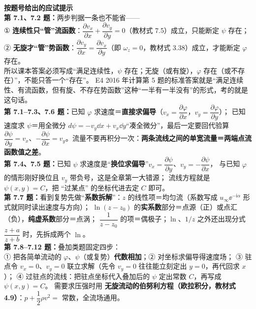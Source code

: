 \begin{banfa}
\textbf{按题号给出的应试提示}\\
\textbf{第 7.1、7.2 题：}两步判据一条也不能省——\\
① \textbf{连续性只“管”流函数}：$\dfrac{\partial v_x}{\partial x}+\dfrac{\partial v_y}{\partial y}=0$（教材式 7.5）成立，只能断定 $\psi$ 存在；
② \textbf{无旋才“管”势函数}：$\dfrac{\partial v_y}{\partial x}=\dfrac{\partial v_x}{\partial y}$（即 $\omega_z=0$，教材式 3.38）成立，才能断定 $\varphi$ 存在。\\
所以课本答案必须写成“满足连续性，$\psi$ 存在；无旋（或有旋），$\varphi$ 存在（或不存在）”，不能只答一个“存在”。
E4 2016 年计算第 5 题的标准答案就是“满足连续性、有流函数，但有旋、不存在势函数”这种“一半有一半没有”的形式，考的就是这句话。\\
\textbf{第 7.1--7.3、7.6 题：}已知 $\varphi$ 求速度＝\textbf{直接求偏导}（$v_x=\dfrac{\partial\varphi}{\partial x}$，$v_y=\dfrac{\partial\varphi}{\partial y}$）；
已知速度求 $\psi$＝用全微分 $d\psi=-v_y\dd x+v_x\dd y$“凑全微分”，最后一定要回代验算
$\dfrac{\partial\psi}{\partial y}=v_x$、$-\dfrac{\partial\psi}{\partial x}=v_y$。流量不要再积分一次：\textbf{两条流线之间的单宽流量＝两端点流函数值之差}。\\
\textbf{第 7.4、7.5 题：}已知 $\psi$ 求速度是“\textbf{换位求偏导}”$v_x=\dfrac{\partial\psi}{\partial y}$、$v_y=-\dfrac{\partial\psi}{\partial x}$，
与已知 $\varphi$ 的情形刚好换位且 $v_y$ 带负号，这是全章第一大错源；
流线方程就是 $\psi(x,y)=C$，把 ``过某点'' 的坐标代进去定 $C$ 即可。\\
\textbf{第 7.7 题：}看到复势先做“\textbf{系数拆解}”：$z$ 的线性项＝均匀流（系数写成 $u_\infty\ee^{-\mathrm{i}\alpha}$ 形式就同时读出速度与方向）；
$\ln(z-z_0)$ 的\textbf{实系数}部分＝点源（正）或点汇（负），\textbf{纯虚系数}部分＝点涡；
$\dfrac{1}{z-z_0}$ 的项＝偶极子；$\ln$、$1/z$ 之外还出现分式 $\dfrac{z+a}{z+b}$ 时，先拆成两个 $\ln$。\\
\textbf{第 7.8--7.12 题：}叠加类题固定四步：\\
① 把各简单流动的 $\varphi$、$\psi$（或复势）\textbf{代数相加}；② 对坐标求偏导得速度场；
③ 驻点令 $v_x=0$、$v_y=0$ 联立求解（先令 $v_y=0$ 往往能立刻定出 $y=0$，再代回求 $x$）；
④ 过驻点的流线：把驻点坐标代入叠加后的 $\psi$ 定出常数 $C$，再写成 $\psi(x,y)=C$。
需要求压强时用 \textbf{无旋流动的伯努利方程（欧拉积分，教材式 4.9）}：$p+\dfrac{1}{2}\rho v^2=$ 常数，全流场通用。
\end{banfa}

